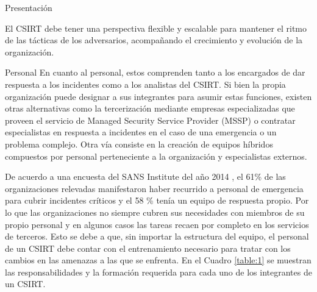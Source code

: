 \begin{section}{Presentación}
        
        El CSIRT debe tener una perspectiva flexible y escalable para mantener el ritmo de las tácticas de los adversarios, acompañando el crecimiento y evolución de la organización. \par
    \end{section}
    
   \begin{section}{Personal}  
   En cuanto al personal, estos comprenden tanto a los encargados de dar respuesta a los incidentes como a los analistas del CSIRT. Si bien la propia organización puede designar a sus integrantes para asumir estas funciones, existen otras alternativas como la tercerización mediante empresas especializadas que proveen el servicio de Managed Security Service Provider (MSSP) o contratar especialistas en respuesta a incidentes en el caso de una emergencia o un problema complejo. Otra vía consiste en la creación de equipos híbridos compuestos por personal perteneciente a la organización y especialistas externos. \par
    De acuerdo a una encuesta del SANS Institute del año 2014 \cite{sans_1}, el 61\% de las organizaciones relevadas manifestaron haber recurrido a personal de emergencia para cubrir incidentes críticos y el 58 \% tenía un equipo de respuesta propio. Por lo que las organizaciones no siempre cubren sus necesidades con miembros de su propio personal y en algunos casos las tareas recaen por completo en los servicios de terceros. Esto se debe a que, sin importar la estructura del equipo, el personal de un CSIRT debe contar con el entrenamiento necesario para tratar con los cambios en las amenazas a las que se enfrenta. En el Cuadro \ref{table:1} se muestran las responsabilidades y la formación requerida para cada uno de los integrantes de un CSIRT. \par
    

\end{section}
